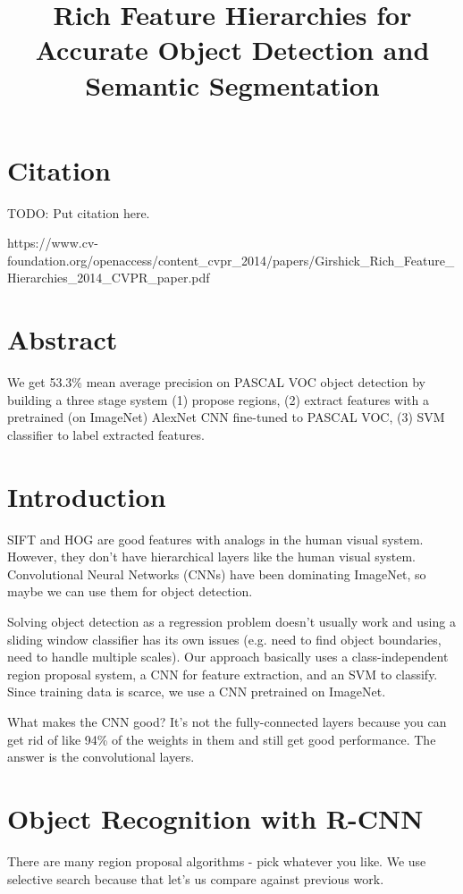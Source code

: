 \documentclass[a4paper]{article}
\title{Rich Feature Hierarchies for Accurate Object Detection and Semantic
Segmentation}
\date{}
\begin{document}
\maketitle

\section{Citation}

TODO: Put citation here.

https://www.cv-foundation.org/openaccess/content_cvpr_2014/papers/Girshick_Rich_Feature_Hierarchies_2014_CVPR_paper.pdf

\section{Abstract}
We get 53.3\% mean average precision on PASCAL VOC object detection by building
a three stage system (1) propose regions, (2) extract features with a pretrained
(on ImageNet) AlexNet CNN fine-tuned to PASCAL VOC, (3) SVM classifier to label
extracted features.

\section{Introduction}
SIFT and HOG are good features with analogs in the human visual system. However,
they don't have hierarchical layers like the human visual system. Convolutional
Neural Networks (CNNs) have been dominating ImageNet, so maybe we can use them
for object detection.

Solving object detection as a regression problem doesn't usually work and using
a sliding window classifier has its own issues (e.g. need to find object
boundaries, need to handle multiple scales). Our approach basically uses
a class-independent region proposal system, a CNN for feature extraction,
and an SVM to classify. Since training data is scarce, we use a CNN pretrained
on ImageNet.

What makes the CNN good? It's not the fully-connected layers because you can
get rid of like 94\% of the weights in them and still get good performance.
The answer is the convolutional layers.

\section{Object Recognition with R-CNN}
There are many region proposal algorithms - pick whatever you like. We use
selective search because that let's us compare against previous work.
\end{document}
